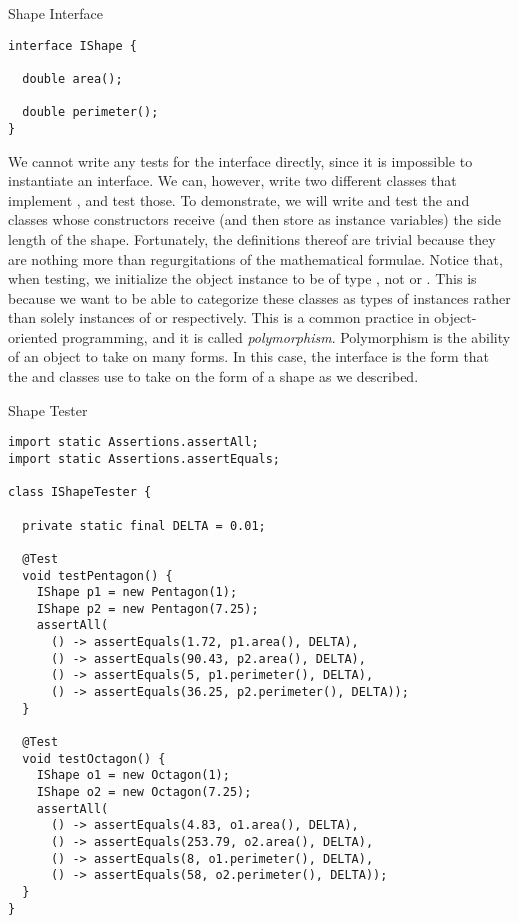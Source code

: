 \begin{cl}[]{Shape Interface}
\begin{lstlisting}[language=MyJava]
interface IShape {

  double area();

  double perimeter();
}
\end{lstlisting}
\end{cl}

We cannot write any tests for the  interface directly, since it is impossible to instantiate an interface. We can, however, write two different classes that implement , and test those. To demonstrate, we will write and test the  and  classes whose constructors receive (and then store as instance variables) the side length of the shape. Fortunately, the definitions thereof are trivial because they are nothing more than regurgitations of the mathematical formulae. Notice that, when testing, we initialize the object instance to be of type , not  or . This is because we want to be able to categorize these classes as types of  instances rather than solely instances of  or  respectively. This is a common practice in object-oriented programming, and it is called \textit{polymorphism}. Polymorphism is the ability of an object to take on many forms. In this case, the  interface is the form that the  and  classes use to take on the form of a shape as we described.

\begin{cl}[]{Shape Tester}
\begin{lstlisting}[language=MyJava]
import static Assertions.assertAll;
import static Assertions.assertEquals;

class IShapeTester {

  private static final DELTA = 0.01;
  
  @Test
  void testPentagon() {
    IShape p1 = new Pentagon(1);
    IShape p2 = new Pentagon(7.25);
    assertAll(
      () -> assertEquals(1.72, p1.area(), DELTA),
      () -> assertEquals(90.43, p2.area(), DELTA),
      () -> assertEquals(5, p1.perimeter(), DELTA),
      () -> assertEquals(36.25, p2.perimeter(), DELTA));
  }

  @Test
  void testOctagon() {
    IShape o1 = new Octagon(1);
    IShape o2 = new Octagon(7.25);
    assertAll(
      () -> assertEquals(4.83, o1.area(), DELTA),
      () -> assertEquals(253.79, o2.area(), DELTA),
      () -> assertEquals(8, o1.perimeter(), DELTA),
      () -> assertEquals(58, o2.perimeter(), DELTA));
  }
}
\end{lstlisting}
\end{cl}

